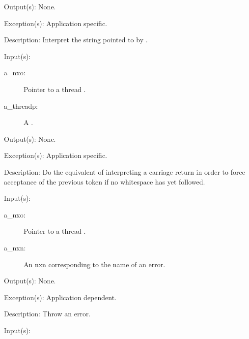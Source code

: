 \begin{capi}
\begin{capilist}
	\item[Output(s): ] None.
	\item[Exception(s): ] Application specific.
	\item[Description: ]
		Interpret the string pointed to by .
	\end{capilist}
\label{nxo_thread_flush}
	\begin{capilist}
	\item[Input(s): ]
		\begin{description}\item[]
		\item[a\_nxo: ]
			Pointer to a thread .
		\item[a\_threadp: ]
			A .
		\end{description}
	\item[Output(s): ] None.
	\item[Exception(s): ] Application specific.
	\item[Description: ]
		Do the equivalent of interpreting a carriage return in order to
		force acceptance of the previous token if no whitespace has yet
		followed.
	\end{capilist}
\label{nxo_thread_nerror}
	\begin{capilist}
	\item[Input(s): ]
		\begin{description}\item[]
		\item[a\_nxo: ]
			Pointer to a thread \classname{nxo}.
		\item[a\_nxn: ]
			An nxn corresponding to the name of an error.
		\end{description}
	\item[Output(s): ] None.
	\item[Exception(s): ] Application dependent.
	\item[Description: ]
		Throw an error.
	\end{capilist}
\label{nxo_thread_serror}
	\begin{capilist}
	\item[Input(s): ]

\end{capilist}
\end{capi}
